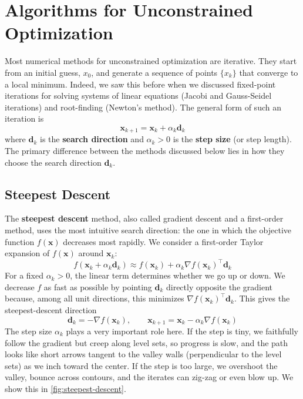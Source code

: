 \section{Algorithms for Unconstrained Optimization}
Most numerical methods for unconstrained optimization are iterative. They start from an initial guess, $x_0$, and generate a sequence of points $\{x_k\}$ that converge to a local minimum. Indeed, we saw this before when we discussed fixed-point iterations for solving systems of linear equations (Jacobi and Gauss-Seidel iterations) and root-finding (Newton's method). The general form of such an iteration is
\begin{equation}
    \mathbf{x}_{k+1} = \mathbf{x}_k + \alpha_k \mathbf{d}_k
    \label{eq:iterative_update}
\end{equation}
where $\mathbf{d}_k$ is the \textbf{search direction} and $\alpha_k > 0$ is the \textbf{step size} (or step length). The primary difference between the methods discussed below lies in how they choose the search direction $\mathbf{d}_k$.

\subsection{Steepest Descent}
\label{sec:steepest-descent}
The \textbf{steepest descent} method, also called gradient descent and a first-order method, uses the most intuitive search direction: the one in which the objective function $f(\mathbf{x})$ decreases most rapidly. We consider a first-order Taylor expansion of $f(\mathbf{x})$ around $\mathbf{x}_k$:
\begin{equation}
f(\mathbf{x}_k+\alpha_k\mathbf{d}_k)\approx f(\mathbf{x}_k) + \alpha_k \nabla f(\mathbf{x}_k)^{\top}\mathbf{d}_k
\end{equation}
For a fixed $\alpha_k>0$, the linear term determines whether we go up or down. We decrease $f$ as fast as possible by pointing $\mathbf{d}_k$ directly opposite the gradient because, among all unit directions, this minimizes $\nabla f(\mathbf{x}_k)^{\top}\mathbf{d}_k$. This gives the steepest-descent direction
\begin{equation}
\mathbf{d}_k=-\nabla f(\mathbf{x}_k), \qquad
\mathbf{x}_{k+1}=\mathbf{x}_k-\alpha_k\nabla f(\mathbf{x}_k)
\end{equation}
The step size $\alpha_k$ plays a very important role here. If the step is tiny, we faithfully follow the gradient but creep along level sets, so progress is slow, and the path looks like short arrows tangent to the valley walls (perpendicular to the level sets) as we inch toward the center. If the step is too large, we overshoot the valley, bounce across contours, and the iterates can zig-zag or even blow up. We show this in \autoref{fig:steepest-descent}.

